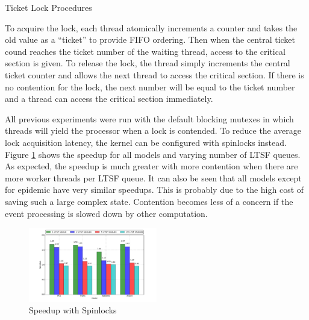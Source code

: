\documentclass[11pt]{book}
\begin{document}
\begin{algorithm}
\DontPrintSemicolon
{}

    \;


    \caption{Ticket Lock Procedures\cite{wiki:ticketlock-15}}\label{ticket_lock}
\end{algorithm}

To acquire the lock, each thread atomically increments a counter and takes the old value as a
``ticket'' to provide FIFO ordering.  Then when the central ticket cound reaches the ticket number
of the waiting thread, access to the critical section is given.  To release the lock, the thread
simply increments the central ticket counter and allows the next thread to access the critical
section.  If there is no contention for the lock, the next number will be equal to the ticket number
and a thread can access the critical section immediately.

All previous experiments were run with the default blocking mutexes in which threads will yield the
processor when a lock is contended.  To reduce the average lock acquisition latency, the kernel can
be configured with spinlocks instead.  Figure \ref{spinlock_speedup} shows the speedup for all
models and varying number of LTSF queues.  As expected, the speedup is much greater with more
contention when there are more worker threads per LTSF queue.  It can also be seen that all models
except for epidemic have very similar speedups.  This is probably due to the high cost of saving
such a large complex state.  Contention becomes less of a concern if the event processing is slowed
down by other computation.

\begin{figure}
\centering
  \includegraphics[width=0.5\textwidth,quiet]{figs/pending_event_set/spinlock_speedup.pdf}
  \caption{Speedup with Spinlocks}\label{spinlock_speedup}
\end{figure}
\end{document}
